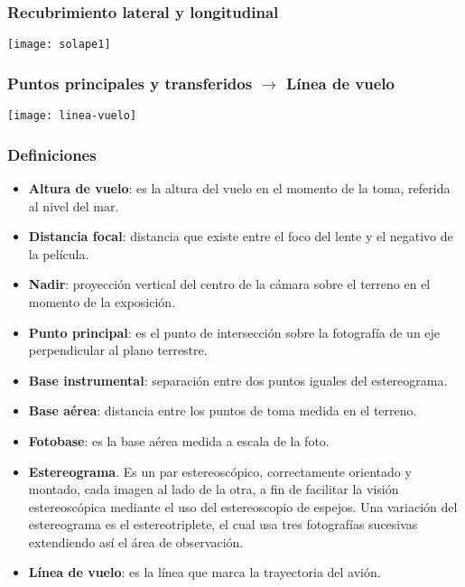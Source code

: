 \documentclass[14pt]{beamer}
\begin{document}
\begin{frame}
\frametitle{Recubrimiento lateral y longitudinal}
\begin{center}
\texttt{[image: solape1]}
\end{center}
\end{frame}
\begin{frame}
\frametitle{Puntos principales y transferidos $\rightarrow$ Línea de vuelo}
\begin{center}
\texttt{[image: linea-vuelo]}
\end{center}
\end{frame}
\begin{frame}
\frametitle{Definiciones}
\scriptsize{
\begin{itemize}
\item \textbf{Altura de vuelo}: es la altura del vuelo en el momento de la toma, referida al nivel del mar.\\
\item \textbf{Distancia focal}: distancia que existe entre el foco del lente y el negativo de la película.\\
\item \textbf{Nadir}: proyección vertical del centro de la cámara sobre el terreno en el momento de la exposición.\\
\item \textbf{Punto principal}: es el punto de intersección sobre la fotografía de un eje perpendicular al plano terrestre. \\
\item \textbf{Base instrumental}: separación entre dos puntos iguales del estereograma.\\
\item \textbf{Base aérea}: distancia entre los puntos de toma medida en el terreno.\\
\item \textbf{Fotobase}: es la base aérea medida a escala de la foto.\\
\item \textbf{Estereograma}. Es un par estereoscópico, correctamente orientado y montado, cada imagen al lado de la otra, a fin de facilitar la visión estereoscópica mediante el uso del estereoscopio de espejos. Una variación del estereograma es el estereotriplete, el cual usa tres fotografías sucesivas extendiendo así el área de observación.\\
\item \textbf{Línea de vuelo}: es la línea que marca la trayectoria del avión.
\end{itemize}
}
\end{frame}
\end{document}
